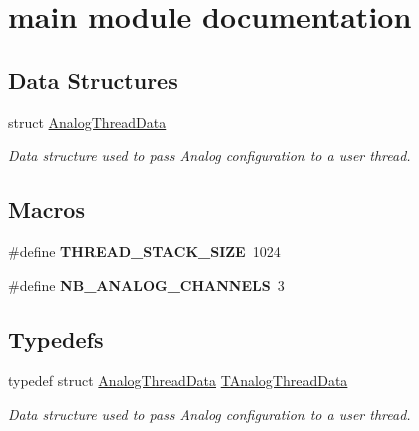 \hypertarget{group__main__module}{}\section{main module documentation}
\label{group__main__module}
\subsection*{Data Structures}
\begin{DoxyCompactItemize}
\item 
struct \hyperlink{struct_analog_thread_data}{Analog\+Thread\+Data}
\begin{DoxyCompactList}\small\item\em Data structure used to pass Analog configuration to a user thread. \end{DoxyCompactList}\end{DoxyCompactItemize}
\subsection*{Macros}
\begin{DoxyCompactItemize}
\item 
\hypertarget{group__main__module_ga90b7a8cb7bc3fdbd98014a3e15ee6e9a}{}\#define {\bfseries T\+H\+R\+E\+A\+D\+\_\+\+S\+T\+A\+C\+K\+\_\+\+S\+I\+Z\+E}~1024\label{group__main__module_ga90b7a8cb7bc3fdbd98014a3e15ee6e9a}

\item 
\hypertarget{group__main__module_ga300da08cc989dc0963caf3a5afc024b8}{}\#define {\bfseries N\+B\+\_\+\+A\+N\+A\+L\+O\+G\+\_\+\+C\+H\+A\+N\+N\+E\+L\+S}~3\label{group__main__module_ga300da08cc989dc0963caf3a5afc024b8}

\end{DoxyCompactItemize}
\subsection*{Typedefs}
\begin{DoxyCompactItemize}
\item 
typedef struct \hyperlink{struct_analog_thread_data}{Analog\+Thread\+Data} \hyperlink{group__main__module_gae5f40603a116adc42529ceedda6942c7}{T\+Analog\+Thread\+Data}
\begin{DoxyCompactList}\small\item\em Data structure used to pass Analog configuration to a user thread. \end{DoxyCompactList}\end{DoxyCompactItemize}
